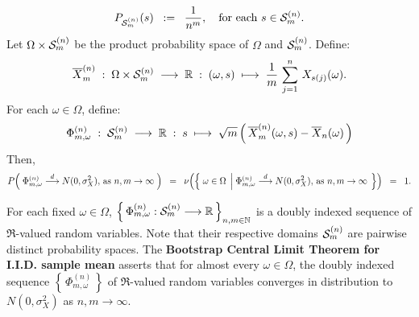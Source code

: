 \begin{theorem}
\begin{equation*}
P_{\mathcal{S}^{(n)}_{m}}(s) \;\; := \;\; \dfrac{1}{n^{m}},
\quad\textnormal{for each $s \in \mathcal{S}^{(n)}_{m}$}.
\end{equation*}
Let $\Omega \times \mathcal{S}^{(n)}_{m}$ be the product probability space of $\Omega$ and $\mathcal{S}^{(n)}_{m}$.
Define:
\begin{equation*}
\overline{X}^{(n)}_{m}
\;:\;\Omega \times \mathcal{S}^{(n)}_{m} \;\longrightarrow \; \mathbb{R}
\;:\; (\omega,s) \; \longmapsto \; \dfrac{1}{m}\,\sum^{n}_{j=1}\,X_{s(j)}(\omega).
\end{equation*}
For each $\omega \in \Omega$, define:
\begin{equation*}
\Phi^{(n)}_{m,\omega}
\;:\;
\mathcal{S}^{(n)}_{m}\;\longrightarrow\; \mathbb{R}
\;:\;
s
\;\longmapsto\;
\sqrt{m}\left(\,\overline{X}^{(n)}_{m}(\omega,s) - \overline{X}_{n}(\omega)\,\right)
\end{equation*}
Then,
\begin{equation*}
P\!\left(\;
\Phi^{(n)}_{m,\omega} \overset{d}{\longrightarrow} N(0,\sigma^{2}_{X}),\,\textnormal{as $n,m\rightarrow\infty$}
\;\right)
\;\; = \;\;
\nu\!\left(\left\{\;
\omega \in \Omega
\;\left\vert\;
\Phi^{(n)}_{m,\omega} \overset{d}{\longrightarrow} N(0,\sigma^{2}_{X}),\,\textnormal{as $n,m\rightarrow\infty$}
\right.
\;\right\}\right)
\;\; = \;\;
1.
\end{equation*}
\end{theorem}

\begin{remark}
\mbox{}\vskip 0.1cm
\noindent
For each fixed $\omega \in \Omega$,
$\left\{\,\Phi^{(n)}_{m,\omega} : \mathcal{S}^{(n)}_{m} \longrightarrow \mathbb{R}\,\right\}_{n,m\in\mathbb{N}}$
is a doubly indexed sequence of $\Re$-valued random variables.
Note that their respective domains $\mathcal{S}^{(n)}_{m}$ are pairwise distinct probability spaces.
The \textbf{Bootstrap Central Limit Theorem for I.I.D. sample mean}
asserts that for almost every $\omega \in \Omega$,
the doubly indexed sequence $\left\{\,\Phi^{(n)}_{m,\omega}\,\right\}$
of $\Re$-valued random variables converges in distribution to
$N(0,\sigma^{2}_{X})$ as $n, m \longrightarrow \infty$.
\end{remark}

